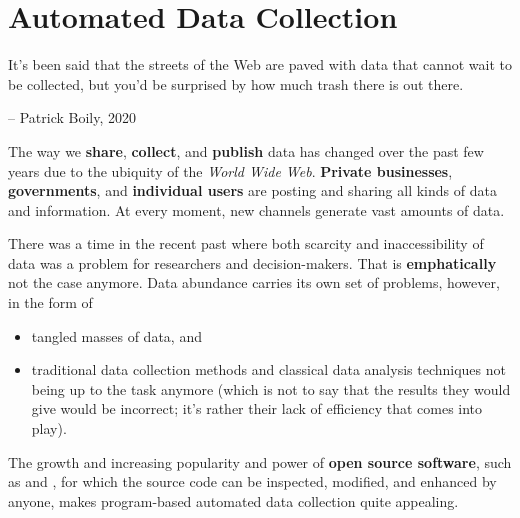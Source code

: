 \section{Automated Data Collection}
\begin{tcolorbox}[title=One Man's Trash...]
It's been said that the streets of the Web are paved with data that cannot wait to be collected, but you'd be surprised by how much trash there is out there. \\[-0.6cm]
\begin{flushright}
-- Patrick Boily, 2020
\end{flushright}
\end{tcolorbox}
\noindent The way we \textbf{share}, \textbf{collect}, and \textbf{publish} data has changed over the past few years due to the ubiquity of the \textit{World Wide Web}. \textbf{Private businesses}, \textbf{governments}, and \textbf{individual users} are posting and sharing all kinds of data and information. At every moment, new channels generate vast amounts of data.

There was a time in the recent past where both scarcity and inaccessibility of data was a problem for researchers and decision-makers. That is \textbf{emphatically} not the case anymore.
\newl Data abundance carries its own set of problems, however, in the form of 
\begin{itemize}[noitemsep]
\item tangled masses of data, and 
\item traditional data collection methods and classical data analysis techniques not being up to the task anymore (which is not to say that the results they would give would be incorrect; it's rather their lack of efficiency that comes into play).
\end{itemize}
The growth and increasing popularity and power of \textbf{open source software}, such as  and , for which the source code can be inspected, modified, and enhanced by anyone, makes program-based automated data collection quite appealing. 

